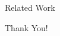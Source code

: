 \documentclass[t,12pt,numbers,fleqn,usenames,xcolor=dvipsnames]{beamer}
\begin{document}
\begin{comment}[fragile]{Conclusion}
\scriptsize{
\begin{lstlisting}
	IdempotentMagma := Magma extended_by {idemp : }
		CommutativeMagma := Magma extended_by {comm : }
		Semigroup := Magma extended_by {assoc : }
		IdempotentCommutativeSemigroup := 
		BCOMBINE (diag (IdempotentMagma CommutativeMagma Semigroup))
		\end{lstlisting}}
	\scriptsize{
		\begin{center}
			\begin{tikzpicture}[scale=.8]
			\node (M)    at (0,0)      {\Magma};
			\node (CM) at (-4,-1) {\CommMagma};
			\node (AM) at (1,0) {$\cn{AdditiveMagma}$};
			\node (SG)  at (0,-1)   {\Semigroup};
			\node (IM)  at  (4,-1)   {\IdempMagma};
			\draw[mono](M) -- (CM);
			\draw[arrow,blue](M) -- (AM);
			\draw[mono](M) -- (SG); 
			\draw[mono](M) -- (IM);
			\node (CSG)  at (-5,-2)   {\CommutativeSemigroup};
			\node (ISG)    at (5,-2)    {\IdempotentSemigroup};
			\node (ICM)    at (0,-2)    {\IdempotentCommutativeMagma};
			\node (ACSG)  at (0,-3)   {\IdempotentCommutativeSemigroup};
			\draw[mono](CM) -- (CSG);
			\draw[mono](CM) -- (ICM);
			\draw[mono](IM) -- (ISG); 
			\draw[mono](IM) -- (ICM);
			\draw[mono](SG) -- (ISG); 
			\draw[mono](SG) -- (CSG);
			\draw[mono](CSG) -- (ACSG);
			\draw[mono](ISG) -- (ACSG);
			\draw[mono](ICM) -- (ACSG);
			\end{tikzpicture}
	\end{center}}
\end{comment}

\begin{frame}{Related Work}
\nocite{tcpj}
\nocite{DOL}


\end{frame}

\begin{frame}
\vfill
\begin{center}
\Huge Thank You! 
\end{center}
\vfill
\end{frame}
\end{document}
